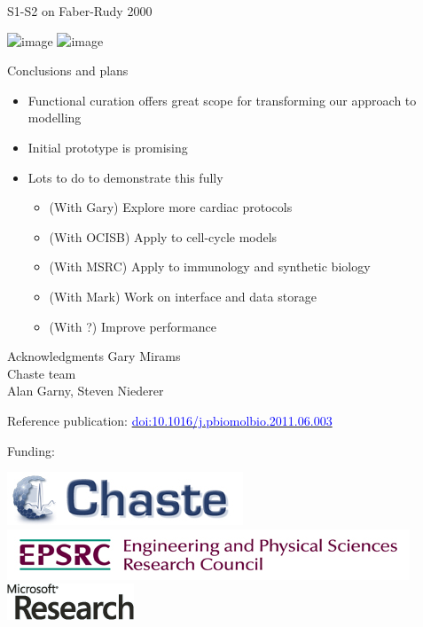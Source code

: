 \documentclass[t,xcolor={usenames,dvipsnames}]{beamer}
\newcommand{\myhref}[2]{\href{#1}{\textcolor{Blue}{#2}}}
\newcommand{\doi}[1]{\myhref{http://dx.doi.org/#1}{doi:#1}}
\begin{document}
\begin{frame}{S1-S2 on Faber-Rudy 2000}
\begin{center}
\includegraphics<1>{faber_rudy_2000_s1s2_curve}
\includegraphics<2>[height=.9\textheight]{faber_rudy_2000_COR_comparison}
\end{center}
\end{frame}

\begin{frame}{Conclusions and plans}
\begin{itemize}
\item Functional curation offers great scope for transforming our approach to modelling
\item Initial prototype is promising
\item Lots to do to demonstrate this fully
  \begin{itemize}
  \item (With Gary) Explore more cardiac protocols
  \item (With OCISB) Apply to cell-cycle models
  \item (With MSRC) Apply to immunology and synthetic biology
  \item (With Mark) Work on interface and data storage
  \item (With ?) Improve performance
  \end{itemize}
\end{itemize}
\end{frame}


\begin{frame}{Acknowledgments}
Gary Mirams\\
Chaste team\\
Alan Garny, Steven Niederer

Reference publication: \doi{10.1016/j.pbiomolbio.2011.06.003}

Funding:

\begin{center}
\includegraphics[scale=.9]{chaste-266x60}\\ \vspace{.4cm}
\includegraphics[width=.55\textwidth]{EPSRC1RGBLO} \hspace{.1cm}
\includegraphics[scale=.55]{logo_msr}
\end{center}
\end{frame}
\end{document}
